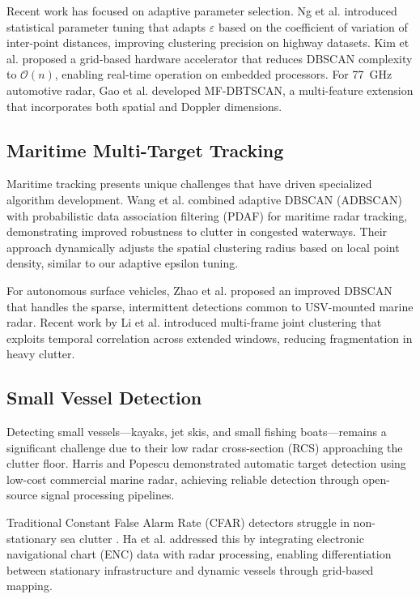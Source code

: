 \documentclass[conf]{new-aiaa}
\begin{document}
Recent work has focused on adaptive parameter selection. Ng et al. \cite{ng2025statistical} introduced statistical parameter tuning that adapts $\varepsilon$ based on the coefficient of variation of inter-point distances, improving clustering precision on highway datasets. Kim et al. \cite{kim2024grid} proposed a grid-based hardware accelerator that reduces DBSCAN complexity to $\mathcal{O}(n)$, enabling real-time operation on embedded processors. For 77~GHz automotive radar, Gao et al. \cite{gao2025mfdbtscan} developed MF-DBTSCAN, a multi-feature extension that incorporates both spatial and Doppler dimensions.

\subsection{Maritime Multi-Target Tracking}
Maritime tracking presents unique challenges that have driven specialized algorithm development. Wang et al. \cite{wang2025adbscan} combined adaptive DBSCAN (ADBSCAN) with probabilistic data association filtering (PDAF) for maritime radar tracking, demonstrating improved robustness to clutter in congested waterways. Their approach dynamically adjusts the spatial clustering radius based on local point density, similar to our adaptive epsilon tuning.

For autonomous surface vehicles, Zhao et al. \cite{zhao2021usvdbscan} proposed an improved DBSCAN that handles the sparse, intermittent detections common to USV-mounted marine radar. Recent work by Li et al. \cite{li2022multiframe} introduced multi-frame joint clustering that exploits temporal correlation across extended windows, reducing fragmentation in heavy clutter.

\subsection{Small Vessel Detection}
Detecting small vessels---kayaks, jet skis, and small fishing boats---remains a significant challenge due to their low radar cross-section (RCS) approaching the clutter floor. Harris and Popescu \cite{harris2022marine} demonstrated automatic target detection using low-cost commercial marine radar, achieving reliable detection through open-source signal processing pipelines.

Traditional Constant False Alarm Rate (CFAR) detectors struggle in non-stationary sea clutter \cite{haykin1994cfar}. Ha et al. \cite{ha2021usv} addressed this by integrating electronic navigational chart (ENC) data with radar processing, enabling differentiation between stationary infrastructure and dynamic vessels through grid-based mapping.
\end{document}
